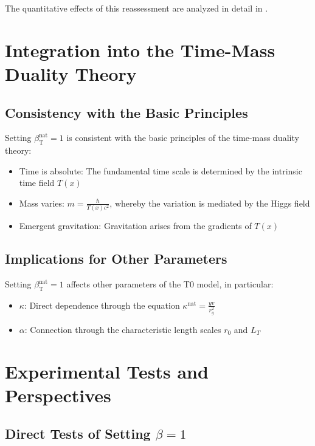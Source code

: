 ﻿\documentclass[12pt,a4paper]{article}
\newcommand{\Tfield}{T(x)}
\newcommand{\betaT}{\beta_{\text{T}}}
\begin{document}
	The quantitative effects of this reassessment are analyzed in detail in \cite{pascher_alphabeta_2025}.
	
	\section{Integration into the Time-Mass Duality Theory}
	
	\subsection{Consistency with the Basic Principles}
	
	Setting \(\betaT^{\text{nat}} = 1\) is consistent with the basic principles of the time-mass duality theory:
	\begin{itemize}
		\item Time is absolute: The fundamental time scale is determined by the intrinsic time field \(\Tfield\)
		\item Mass varies: \(m = \frac{\hbar}{\Tfield c^2}\), whereby the variation is mediated by the Higgs field
		\item Emergent gravitation: Gravitation arises from the gradients of \(\Tfield\)
	\end{itemize}
	
	\subsection{Implications for Other Parameters}
	
	Setting \(\betaT^{\text{nat}} = 1\) affects other parameters of the T0 model, in particular:
	\begin{itemize}
		\item \(\kappa\): Direct dependence through the equation \(\kappa^{\text{nat}} = \frac{y v}{r_g^2}\)
		\item \(\alpha\): Connection through the characteristic length scales \(r_0\) and \(L_T\)
	\end{itemize}
	
	\section{Experimental Tests and Perspectives}
	
	\subsection{Direct Tests of Setting \(\beta = 1\)}
	
\end{document}

